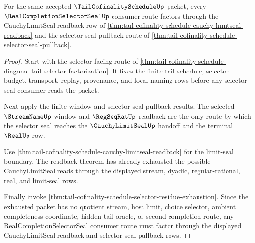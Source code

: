 \begin{theorem}
\label{thm:tail-cofinality-schedule-real-completion-selector-route}
For the same accepted $\TailCofinalityScheduleUp$ packet, every $\RealCompletionSelectorSealUp$ consumer route factors through the CauchyLimitSeal readback row of \autoref{thm:tail-cofinality-schedule-cauchy-limitseal-readback} and the selector-seal pullback route of \autoref{thm:tail-cofinality-schedule-selector-seal-pullback}.
\end{theorem}
\begin{proof}
Start with the selector-facing route of \autoref{thm:tail-cofinality-schedule-diagonal-tail-selector-factorization}. It fixes the finite tail schedule, selector budget, transport, replay, provenance, and local naming rows before any selector-seal consumer reads the packet.

Next apply the finite-window and selector-seal pullback results. The selected $\StreamNameUp$ window and $\RegSeqRatUp$ readback are the only route by which the selector seal reaches the $\CauchyLimitSealUp$ handoff and the terminal $\RealUp$ row.

Use \autoref{thm:tail-cofinality-schedule-cauchy-limitseal-readback} for the limit-seal boundary. The readback theorem has already exhausted the possible CauchyLimitSeal reads through the displayed stream, dyadic, regular-rational, real, and limit-seal rows.

Finally invoke \autoref{thm:tail-cofinality-schedule-selector-residue-exhaustion}. Since the exhausted packet has no quotient stream, host limit, choice selector, ambient completeness coordinate, hidden tail oracle, or second completion route, any RealCompletionSelectorSeal consumer route must factor through the displayed CauchyLimitSeal readback and selector-seal pullback rows.
\end{proof}

